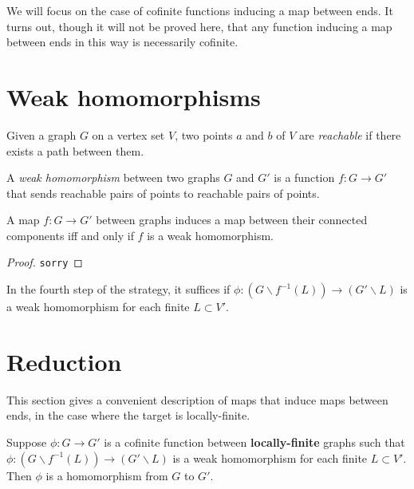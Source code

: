 We will focus on the case of cofinite functions inducing a map between ends. It turns out, though it will not be proved here, that any function inducing a map between ends in this way is necessarily cofinite.

\section{Weak homomorphisms}

\begin{definition}
    \label{def:reachable}
    Given a graph $G$ on a vertex set $V$, two points $a$ and $b$ of $V$ are \emph{reachable} if there exists a path between them.
  \end{definition}
  
  \begin{definition}
    \label{def:weak_graph_hom}
    A \emph{weak homomorphism} between two graphs $G$ and $G'$ is a function $f : G \to G'$ that sends reachable pairs of points to reachable pairs of points.
  \end{definition}
  
  \begin{theorem}
    \label{thm:weak_hom_iff_conn_map}
    A map $f : G \to G'$ between graphs induces a map between their connected components iff and only if $f$ is a weak homomorphism.
  \end{theorem}
  
  \begin{proof}
  \texttt{sorry}
  \end{proof}
  
  In the fourth step of the strategy, it suffices if $\phi : (G \backslash f^{-1}(L)) \to (G' \backslash L)$ is a weak homomorphism for each finite $L \subset V'$.

\section{Reduction}

This section gives a convenient description of maps that induce maps between ends, in the case where the target is locally-finite.

\begin{theorem}
Suppose $\phi : G \to G'$ is a cofinite function between \textbf{locally-finite} graphs such that $\phi : (G \backslash f^{-1}(L)) \to (G' \backslash L)$ is a weak homomorphism for each finite $L \subset V'$. Then $\phi$ is a homomorphism from $G$ to $G'$.
\end{theorem}

